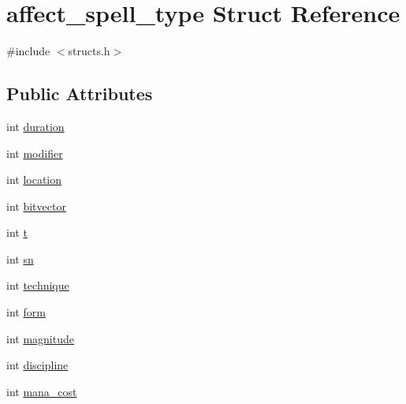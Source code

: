 \hypertarget{structaffect__spell__type}{\section{affect\-\_\-spell\-\_\-type Struct Reference}
\label{structaffect__spell__type}
}


{\ttfamily \#include $<$structs.\-h$>$}

\subsection*{Public Attributes}
\begin{DoxyCompactItemize}
\item 
int \hyperlink{structaffect__spell__type_af86b0815a290a3cab381528de89b11e6}{duration}
\item 
int \hyperlink{structaffect__spell__type_aeb5f162c5a8ee87ccf02c8485522ea74}{modifier}
\item 
int \hyperlink{structaffect__spell__type_a598b713a0035f8abe085db0e98d3ef00}{location}
\item 
int \hyperlink{structaffect__spell__type_af88fddc598f979d5237bf14153678a4e}{bitvector}
\item 
int \hyperlink{structaffect__spell__type_aae146ad6581652774e1832dac50765e2}{t}
\item 
int \hyperlink{structaffect__spell__type_a6e4f95b92bc47e654b58a0ae8e3f1a2e}{sn}
\item 
int \hyperlink{structaffect__spell__type_a406584bf2087e984ce3082256fefed04}{technique}
\item 
int \hyperlink{structaffect__spell__type_a33d1c31e416aff71414c03f51dea3e78}{form}
\item 
int \hyperlink{structaffect__spell__type_ae0f2dd82b7a861879bf6319f9e73dd75}{magnitude}
\item 
int \hyperlink{structaffect__spell__type_a4add0fdecc1994ad0f39cd3ca91194d5}{discipline}
\item 
int \hyperlink{structaffect__spell__type_adebe05ba6cb1f05d1c55f825d9e7734d}{mana\-\_\-cost}
\end{DoxyCompactItemize}


